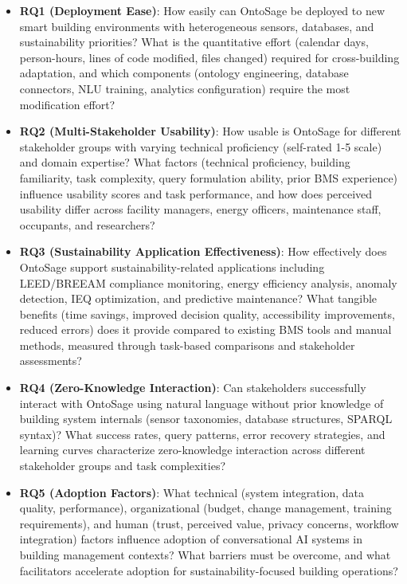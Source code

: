 \documentclass[acmlarge]{acmart}
\begin{document}
\begin{itemize}
    \item \textbf{RQ1 (Deployment Ease)}: How easily can OntoSage be deployed to new smart building environments with heterogeneous sensors, databases, and sustainability priorities? What is the quantitative effort (calendar days, person-hours, lines of code modified, files changed) required for cross-building adaptation, and which components (ontology engineering, database connectors, NLU training, analytics configuration) require the most modification effort?
    
    \item \textbf{RQ2 (Multi-Stakeholder Usability)}: How usable is OntoSage for different stakeholder groups with varying technical proficiency (self-rated 1-5 scale) and domain expertise? What factors (technical proficiency, building familiarity, task complexity, query formulation ability, prior BMS experience) influence usability scores and task performance, and how does perceived usability differ across facility managers, energy officers, maintenance staff, occupants, and researchers?
    
    \item \textbf{RQ3 (Sustainability Application Effectiveness)}: How effectively does OntoSage support sustainability-related applications including LEED/BREEAM compliance monitoring, energy efficiency analysis, anomaly detection, IEQ optimization, and predictive maintenance? What tangible benefits (time savings, improved decision quality, accessibility improvements, reduced errors) does it provide compared to existing BMS tools and manual methods, measured through task-based comparisons and stakeholder assessments?
    
    \item \textbf{RQ4 (Zero-Knowledge Interaction)}: Can stakeholders successfully interact with OntoSage using natural language without prior knowledge of building system internals (sensor taxonomies, database structures, SPARQL syntax)? What success rates, query patterns, error recovery strategies, and learning curves characterize zero-knowledge interaction across different stakeholder groups and task complexities?
    
    \item \textbf{RQ5 (Adoption Factors)}: What technical (system integration, data quality, performance), organizational (budget, change management, training requirements), and human (trust, perceived value, privacy concerns, workflow integration) factors influence adoption of conversational AI systems in building management contexts? What barriers must be overcome, and what facilitators accelerate adoption for sustainability-focused building operations?
\end{itemize}
\end{document}

